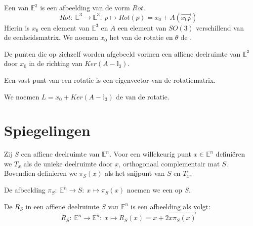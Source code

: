 \documentclass[main.tex]{subfiles}
\begin{document}
\begin{de}
  Een  van $\mathbb{E}^{3}$ is een afbeelding van de vorm $Rot$.
  \[ Rot:\ \mathbb{E}^{3} \rightarrow \mathbb{E}^{3}:\ p \mapsto Rot(p) = x_{0} + A(\overrightarrow{x_{0}p}) \]
  Hierin is $x_{0}$ een element van $\mathbb{E}^{3}$ en $A$ een element van $SO(3)$ verschillend van de eenheidsmatrix.
  We noemen $x_{0}$ het  van de rotatie en $\theta$ de .
\end{de}


\begin{st}
  De punten die op zichzelf worden afgebeeld vormen een affiene deelruimte van $\mathbb{E}^{3}$ door $x_{0}$ in de richting van $Ker(A-\mathbb{I}_{3})$.
\end{st}

\begin{st}
  Een vast punt van een rotatie is een eigenvector van de rotatiematrix.
\end{st}

\begin{de}
  We noemen $L = x_{0} + Ker(A-\mathbb{I}_{3})$ de  van de rotatie.
\end{de}

\section{Spiegelingen}
\label{sec:spiegelingen}

\begin{de}
  Zij $S$ een affiene deelruimte van $\mathbb{E}^{n}$.
  Voor een willekeurig punt $x\in \mathbb{E}^{n}$ defini\"eren we $T_{x}$ als de unieke deelruimte door $x$, orthogonaal complementair mat $S$.
  Bovendien definieren we $\pi_{S}(x)$ als het snijpunt van $S$ en $T_{x}$.
\end{de}
 
\begin{de}
  De afbeelding $\pi_{S}:\ \mathbb{E}^{n} \rightarrow S:\ x \mapsto \pi_{S}(x)$ noemen we een  op $S$.
\end{de}

\begin{de}
  De  $R_{S}$ in een affiene deelruimte $S$ van $\mathbb{E}^{n}$ is een afbeelding als volgt:
  \[ R_{S}:\ \mathbb{E}^{n} \rightarrow \mathbb{E}^{n}:\ x \mapsto R_{S}(x) = x + 2\overrightarrow{x\pi_{S}(x)} \]
\end{de}
\end{document}
